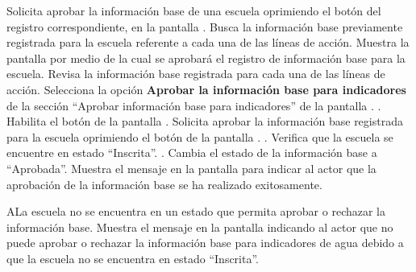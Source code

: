 \begin{UCtrayectoria}
    \UCpaso[\UCactor] Solicita aprobar la información base de una escuela oprimiendo el botón \botOk del registro correspondiente, en la pantalla .
    \UCpaso[\UCsist] Busca la información base previamente registrada para la escuela referente a cada una de las líneas de acción.
    \UCpaso[\UCsist] Muestra la pantalla  por medio de la cual se aprobará el registro de información base para la escuela.
    \UCpaso[\UCactor] Revisa la información base registrada para cada una de las líneas de acción.
    \UCpaso[\UCactor] Selecciona la opción {\bf Aprobar la información base para indicadores} de la sección ``Aprobar información base para indicadores'' de la pantalla . .
    \UCpaso[\UCsist] Habilita el botón  de la pantalla .
    \UCpaso[\UCactor] Solicita aprobar la información base registrada para la escuela oprimiendo el botón  de la pantalla . .
    \UCpaso[\UCsist] Verifica que la escuela se encuentre en estado ``Inscrita''. . 
    \UCpaso[\UCsist] Cambia el estado de la información base a ``Aprobada''.
    \UCpaso[\UCsist] Muestra el mensaje  en la pantalla  para indicar al actor que la aprobación de la información base se ha realizado exitosamente.    
 \end{UCtrayectoria}
 
 \begin{UCtrayectoriaA}{A}{La escuela no se encuentra en un estado que permita aprobar o rechazar la información base.}
    \UCpaso[\UCsist] Muestra el mensaje  en la pantalla  indicando al actor que no puede aprobar o rechazar la información base para indicadores de agua debido a que la escuela no se encuentra en estado ``Inscrita''. 
 \end{UCtrayectoriaA}
 
